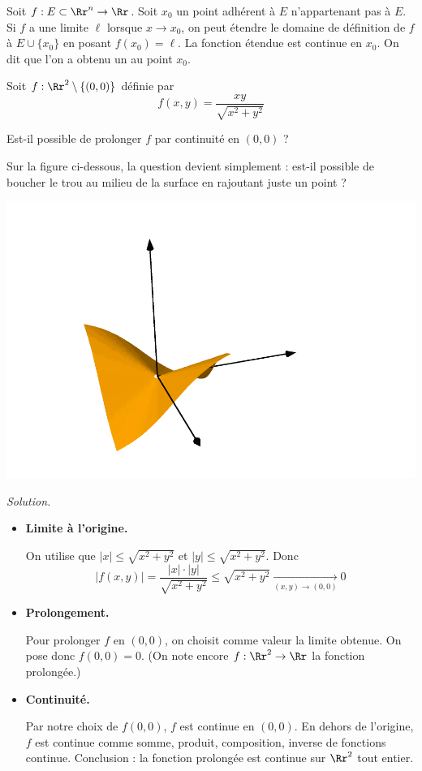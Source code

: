 \documentclass[12pt, class=report,crop=false]{standalone}
\begin{document}
\begin{definition}
Soit $f: E \subset \Rr^n \to \Rr$. Soit $x_0$ un point adhérent à $E$ 
n'appartenant pas à $E$. Si $f$ a une limite $\ell$ lorsque $x \to x_0$,
on peut étendre le domaine de définition de $f$ à $E \cup \lbrace x_0 \rbrace$ en posant $f(x_0)=\ell$. 
La fonction étendue est continue en $x_0$. On dit que l'on a obtenu un  au point $x_0$.
\end{definition}


\begin{exemple}
Soit $f : \Rr^2 \setminus \{ (0,0) \}$ définie par 
$$f(x,y) = \frac{xy}{\sqrt{x^2+y^2}}$$

Est-il possible de prolonger $f$ par continuité en $(0,0)$ ?

Sur la figure ci-dessous, la question devient simplement : est-il possible de 
boucher le trou au milieu de la surface en rajoutant juste un point ?
\begin{center}
\includegraphics[scale=0.3]{figures/fig-plusvar-34-01}  
\end{center}

\bigskip
\emph{Solution.}

\begin{itemize}
  \item \textbf{Limite à l'origine.}
  
  On utilise que $|x| \le \sqrt{x^2+y^2}$ et $|y| \le \sqrt{x^2+y^2}$.
  Donc
  $$| f(x,y) |  = \frac{|x| \cdot |y|}{\sqrt{x^2+y^2}}
  \le \sqrt{x^2+y^2} \underset{(x,y) \to (0,0)}{\longrightarrow} 0$$
  
  \item \textbf{Prolongement.}
  
  Pour prolonger $f$ en $(0,0)$, on choisit comme valeur la limite obtenue.  
  On pose donc $f(0,0) = 0$. (On note encore $f : \Rr^2 \to \Rr$ la fonction prolongée.) 
  
  \item \textbf{Continuité.}
  
  Par notre choix de $f(0,0)$, $f$ est continue en $(0,0)$.
  En dehors de l'origine, $f$ est continue comme somme, produit, composition, inverse de fonctions continue. 
  Conclusion : la fonction prolongée est continue sur $\Rr^2$ tout entier.
\end{itemize}  
\end{exemple}
\end{document}

